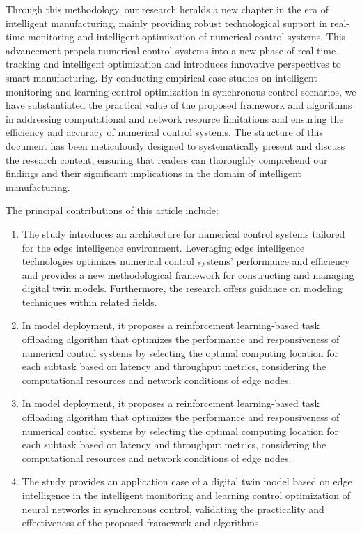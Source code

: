 \documentclass[preprint,12pt]{elsarticle}
\begin{document}
Through this methodology, our research heralds a new chapter in the era of intelligent manufacturing, mainly providing robust technological support in real-time monitoring and intelligent optimization of numerical control systems.  This advancement propels numerical control systems into a new phase of real-time tracking and intelligent optimization and introduces innovative perspectives to smart manufacturing.  By conducting empirical case studies on intelligent monitoring and learning control optimization in synchronous control scenarios, we have substantiated the practical value of the proposed framework and algorithms in addressing computational and network resource limitations and ensuring the efficiency and accuracy of numerical control systems.  The structure of this document has been meticulously designed to systematically present and discuss the research content, ensuring that readers can thoroughly comprehend our findings and their significant implications in the domain of intelligent manufacturing.

The principal contributions of this article include:

\begin{enumerate}
    \item The study introduces an architecture for numerical control systems tailored for the edge intelligence environment. Leveraging edge intelligence technologies optimizes numerical control systems' performance and efficiency and provides a new methodological framework for constructing and managing digital twin models. Furthermore, the research offers guidance on modeling techniques within related fields.

    \item  In model deployment, it proposes a reinforcement learning-based task offloading algorithm that optimizes the performance and responsiveness of numerical control systems by selecting the optimal computing location for each subtask based on latency and throughput metrics, considering the computational resources and network conditions of edge nodes.

    \item  In model deployment, it proposes a reinforcement learning-based task offloading algorithm that optimizes the performance and responsiveness of numerical control systems by selecting the optimal computing location for each subtask based on latency and throughput metrics, considering the computational resources and network conditions of edge nodes.

    \item The study provides an application case of a digital twin model based on edge intelligence in the intelligent monitoring and learning control optimization of neural networks in synchronous control, validating the practicality and effectiveness of the proposed framework and algorithms.
    
\end{enumerate}
\end{document}
